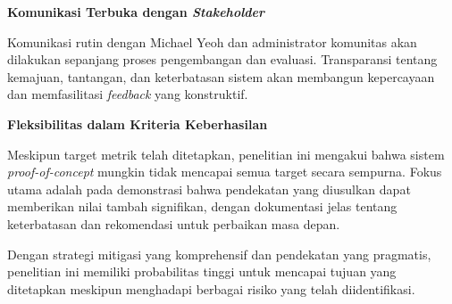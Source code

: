 \textbf{Komunikasi Terbuka dengan \textit{Stakeholder}}

Komunikasi rutin dengan Michael Yeoh dan administrator komunitas akan dilakukan sepanjang proses pengembangan dan evaluasi. Transparansi tentang kemajuan, tantangan, dan keterbatasan sistem akan membangun kepercayaan dan memfasilitasi \textit{feedback} yang konstruktif.

\textbf{Fleksibilitas dalam Kriteria Keberhasilan}

Meskipun target metrik telah ditetapkan, penelitian ini mengakui bahwa sistem \textit{proof-of-concept} mungkin tidak mencapai semua target secara sempurna. Fokus utama adalah pada demonstrasi bahwa pendekatan yang diusulkan dapat memberikan nilai tambah signifikan, dengan dokumentasi jelas tentang keterbatasan dan rekomendasi untuk perbaikan masa depan.

Dengan strategi mitigasi yang komprehensif dan pendekatan yang pragmatis, penelitian ini memiliki probabilitas tinggi untuk mencapai tujuan yang ditetapkan meskipun menghadapi berbagai risiko yang telah diidentifikasi.